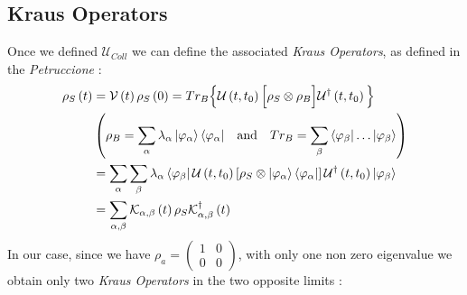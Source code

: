 \documentclass[a4paper,12pt]{article}
\begin{document}
\subsection{Kraus Operators}
Once we defined $ \mathcal{U}_{Coll} $ we can define the associated \textit{Kraus Operators}, as defined in the \textit{Petruccione} :
\begin{align}
	\rho_{S} \left(t\right) &= \mathcal{V}\left(t\right) \rho_{S} \left(0\right) = Tr_{B} \Big\{ \mathcal{U}\left(t, t_0\right) \Big[ \rho_{S} \otimes \rho_{B} \Big] \mathcal{U}^{\dagger}\left(t, t_0\right) \Big\} \\
	&\left( \rho_{B} = \sum_{\alpha}{\lambda_{\alpha} \ket{\varphi_{\alpha}} \bra{\varphi_{\alpha}}} \quad \text{and} \quad Tr_{B} = \sum_{\beta}{\bra{\varphi_{\beta}} \dots \ket{\varphi_{\beta}}} \right) \notag \\
	&= \sum_{\alpha}{\sum_{\beta}{\lambda_{\alpha}\bra{\varphi_{\beta}} \mathcal{U}\left(t, t_0\right) \left[ \rho_{S} \otimes \ket{\varphi_{\alpha}} \bra{\varphi_{\alpha}} \right]  \mathcal{U}^{\dagger}\left(t, t_0\right) \ket{\varphi_{\beta}} }} \notag \\
	&= \sum_{\alpha, \beta}{ \mathcal{K}_{\alpha, \beta} \left(t\right) \rho_{S} \mathcal{K}^{\dagger}_{\alpha, \beta} \left(t\right) }
	\label{eq:dynamical_map_kraus_operators}
\end{align}
In our case, since we have $ \rho_{a} = \begin{pmatrix} 1 & 0 \\ 0 & 0 \end{pmatrix} $, with only one non zero eigenvalue we obtain only two \textit{Kraus Operators} in the two opposite limits : 
\end{document}
